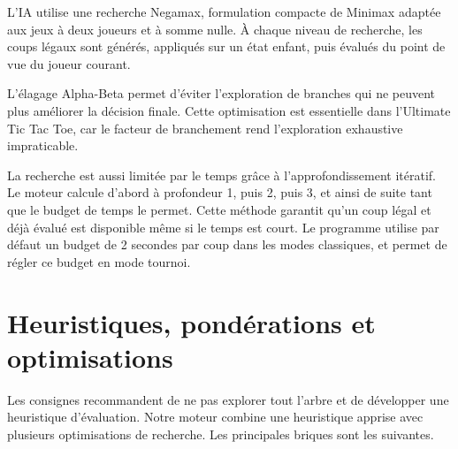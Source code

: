 \documentclass{pssbmac}
\begin{document}
L'IA utilise une recherche Negamax, formulation compacte de Minimax adaptée aux jeux à deux joueurs et à somme nulle. À chaque niveau de recherche, les coups légaux sont générés, appliqués sur un état enfant, puis évalués du point de vue du joueur courant.

L'élagage Alpha-Beta permet d'éviter l'exploration de branches qui ne peuvent plus améliorer la décision finale. Cette optimisation est essentielle dans l'Ultimate Tic Tac Toe, car le facteur de branchement rend l'exploration exhaustive impraticable.

La recherche est aussi limitée par le temps grâce à l'approfondissement itératif. Le moteur calcule d'abord à profondeur 1, puis 2, puis 3, et ainsi de suite tant que le budget de temps le permet. Cette méthode garantit qu'un coup légal et déjà évalué est disponible même si le temps est court. Le programme utilise par défaut un budget de 2 secondes par coup dans les modes classiques, et permet de régler ce budget en mode tournoi.

\section{Heuristiques, pondérations et optimisations}

Les consignes recommandent de ne pas explorer tout l'arbre et de développer une heuristique d'évaluation. Notre moteur combine une heuristique apprise avec plusieurs optimisations de recherche. Les principales briques sont les suivantes.
\end{document}
